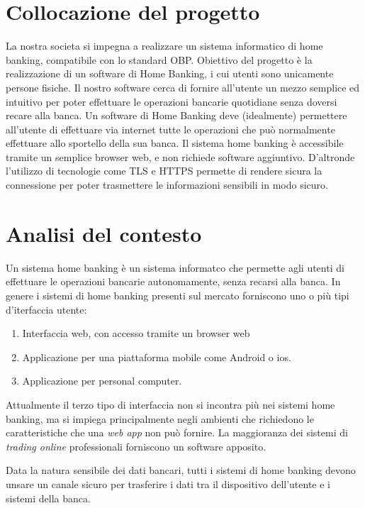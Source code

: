 \documentclass[10pt]{softeng} %
\begin{document}
\startofdocument{}

\section{Collocazione del progetto}

La nostra societa si impegna a realizzare un sistema informatico di home banking, compatibile con lo standard OBP.
Obiettivo del progetto \`e la realizzazione di un software di Home Banking, i cui utenti sono unicamente persone fisiche.
Il nostro software cerca di fornire all'utente un mezzo semplice ed intuitivo per poter effettuare le operazioni bancarie quotidiane senza doversi recare alla banca.
Un software di Home Banking deve (idealmente) permettere all'utente di effettuare via internet tutte le operazioni che pu\`o normalmente effettuare allo sportello della sua banca.
Il sistema home banking \`e accessibile tramite un semplice browser web, e non richiede software aggiuntivo.
D'altronde l'utilizzo di tecnologie come TLS e HTTPS permette di rendere sicura la connessione per poter trasmettere le informazioni sensibili in modo sicuro.


\section{Analisi del contesto}
Un sistema home banking \`e un sistema informatco che permette agli utenti di effettuare le operazioni bancarie autonomamente, senza recarsi alla banca.
In genere i sistemi di home banking presenti sul mercato forniscono uno o pi\`u tipi d'iterfaccia utente:
\begin{enumerate}
    \item Interfaccia web, con accesso tramite un browser web
    \item Applicazione per una piattaforma mobile come Android o ios.
    \item Applicazione per personal computer.
\end{enumerate}
Attualmente il terzo tipo di interfaccia non si incontra pi\`u nei sistemi home banking, ma si impiega principalmente negli ambienti che richiedono le caratteristiche che una \emph{web app} non pu\`o fornire. La maggioranza dei sistemi di \emph{trading online} professionali forniscono un software apposito.


Data la natura sensibile dei dati bancari, tutti i sistemi di home banking devono unsare un canale sicuro per trasferire i dati tra il dispositivo dell'utente e i sistemi della banca.
\end{document}
